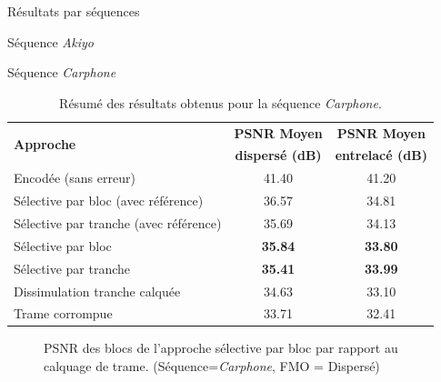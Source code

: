 \begin{section}{Résultats par séquences}
\begin{subsection}{Séquence \textit{Akiyo}}
\FloatBarrier
\end{subsection}


\begin{subsection}{Séquence \textit{Carphone}}
\begin{table}
\caption[Résumé des résultats obtenus pour la séquence
\textit{Carphone}]{Résumé des résultats obtenus pour la séquence \textit{Carphone}.}
\centering
\begin{tabular}{| l | c | c |}
 \hline
 \multirow{2}{*}{\textbf{Approche}} & \textbf{PSNR Moyen}& \textbf{PSNR Moyen}\\
 &\textbf{dispersé (dB)}&\textbf{entrelacé (dB)}\\
 \hline
Encodée (sans erreur) & 41.40 & 41.20\\
Sélective par bloc (avec référence) & 36.57 & 34.81\\
Sélective par tranche (avec référence) & 35.69 & 34.13\\
Sélective par bloc & \textbf{35.84} &\textbf{33.80}\\
Sélective par tranche & \textbf{35.41} &\textbf{33.99}\\
Dissimulation tranche calquée & 34.63 &33.10\\
Trame corrompue & 33.71 &32.41\\
\hline
\end{tabular}
\end{table}

\begin{figure}  \caption[]{PSNR des blocs de l'approche sélective par bloc par rapport au
calquage de trame. (Séquence=\textit{Carphone}, FMO = Dispersé)}
\label{fig-ParSequenceDispersed4}
\end{figure}


\end{subsection}
\end{section}
